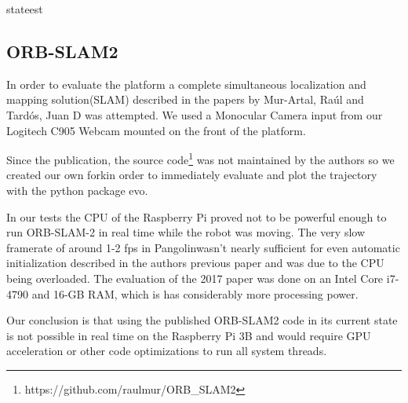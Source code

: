 \documentclass[class=article, crop=false]{standalone}
\begin{document}
{stateest}

\subsection{ORB-SLAM2}\label{subsec:orbslam2}

In order to evaluate the platform a complete simultaneous localization and mapping solution(SLAM) described in the papers\cite{mur2017orb}\cite{mur2015orb} by Mur-Artal, Ra\'ul and Tard{\'o}s, Juan D was attempted. We used a Monocular Camera input from our Logitech C905 Webcam mounted on the front of the platform.

Since the publication, the source code\footnote{https://github.com/raulmur/ORB\_SLAM2} was not maintained by the authors so we created our own fork\footnotemark in order to immediately evaluate and plot the trajectory with the python package evo\cite{grupp2017evo}.


In our tests the CPU of the Raspberry Pi proved not to be powerful enough to run ORB-SLAM-2 in real time while the robot was moving. The very slow framerate of around 1-2 fps in Pangolin\footnotemark wasn't nearly sufficient for even automatic initialization described in the authors previous paper\cite{mur2015orb} and was due to the CPU being overloaded. The evaluation of the 2017 paper\cite{mur2017orb} was done on an Intel Core i7-4790 and 16-GB RAM, which is has considerably more processing power.


Our conclusion is that using the published ORB-SLAM2 code in its current state is not possible in real time on the Raspberry Pi 3B and would require GPU acceleration or other code optimizations to run all system threads.
\end{document}
